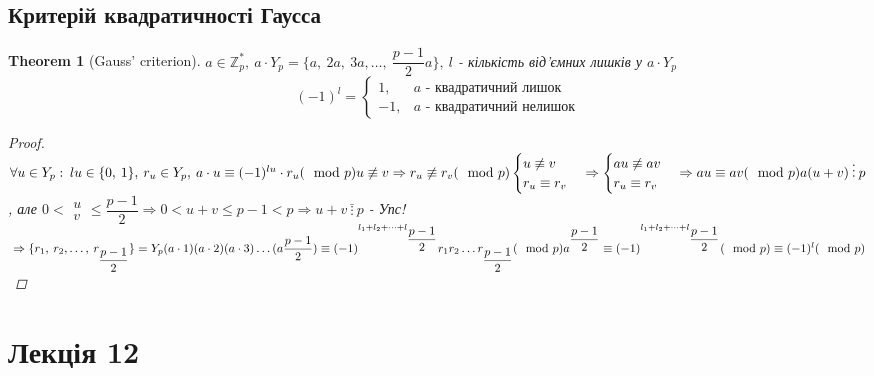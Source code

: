 \documentclass[a4paper,12pt, centered]{bookest}
\newtheorem{theorem}{Theorem}[section]
\begin{document}
\section{Критерій квадратичності Гаусса}
\begin{theorem}[Gauss' criterion]
	$a\in\mathbb{Z}_p^*,\>a\cdot Y_p=\{a,\>2a,\>3a,\dots,\>\dfrac {p-1}{2}a\},\>l$ - кількість від'ємних лишків у $a\cdot Y_p$
	$$(-1)^l=\left\{\begin{array}{ll}
		1, & a\textrm{ - квадратичний лишок}\\
		-1, & a\textrm{ - квадратичний нелишок}	 
	\end{array}\right.$$
	\begin{proof}
		$\\\forall u\in Y_p:\>lu\in\{0,\>1\},\>r_u\in Y_p,\>a\cdot u\equiv(-1)^{lu}\cdot r_u(\mod p)\\u\not\equiv v\Rightarrow r_u\not\equiv r_v(\mod p)\\\begin{cases}
			u\not\equiv v\\r_u\equiv r_v
		\end{cases}\Rightarrow\begin{cases}
			au\not\equiv av\\r_u\equiv r_v
		\end{cases}\Rightarrow au\equiv av(\mod p)\\a(u+v)\>\vdots\>p$, але $0<\begin{array}{c}
			u\\v 
		\end{array}\leq \dfrac {p-1}{2}\Rightarrow0<u+v\leq p-1<p\Rightarrow u+v\>\bar{\vdots}\>p$ - Упс!
		$\\\Rightarrow\{r_1,\>r_2,\dots,\>r_{\dfrac {p-1}{2}}\}=Y_p\\(a\cdot1)(a\cdot2)(a\cdot3)\dots(a\dfrac {p-1}{2})\equiv(-1)^{l_1+l_2+\dots+l_{\dfrac {p-1}{2}}}r_1r_2\dots r_{\dfrac {p-1}{2}}(\mod p)\\a^{\dfrac {p-1}{2}}\equiv(-1)^{l_1+l_2+\dots+l_{\dfrac {p-1}{2}}}(\mod p)\equiv(-1)^l(\mod p)$
	\end{proof}
\end{theorem}
\chapter{Лекція 12                                                                                                                                                                   }
\end{document}
